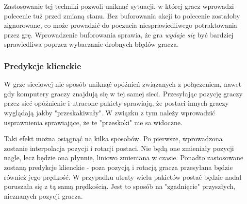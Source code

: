 Zastosowanie tej techniki pozwoli uniknąć sytuacji, w której gracz wprowadzi polecenie tuż przed zmianą stanu. Bez buforowania akcji to polecenie zostałoby zignorowane, co może prowadzić do poczucia niesprawiedliwego potraktowania przez grę. Wprowadzenie buforowania sprawia, że gra \emph{wydaje się} być bardziej sprawiedliwa poprzez wybaczanie drobnych błędów gracza.

\subsubsection{Predykcje klienckie}\label{sec:concept_prediction}

W grze sieciowej nie sposób uniknąć opóźnień związanych z połączeniem, nawet gdy komputery graczy znajdują się w tej samej sieci. Przesyłając pozycję graczy przez sieć opóźnienie i utracone pakiety sprawiają, że postaci innych graczy wyglądają jakby "przeskakiwały". W związku z tym należy wprowadzić usprawnienia sprawiające, że te "przeskoki" nie sa widoczne. 

Taki efekt można osiągnąć na kilka sposobów. Po pierwsze, wprowadzona zostanie interpolacja pozycji i rotacji postaci. Nie będą one zmieniały pozycji nagle, lecz będzie ona płynnie, liniowo zmieniana w czasie. Ponadto zastosowane zostaną predykcje klienckie - poza pozycją i rotacją gracza przesyłana będzie również jego prędkość. W przypadku utraty wielu pakietów postać będzie nadal poruszała się z tą samą prędkością. Jest to sposób na "zgadnięcie" przyszłych, nieznanych pozycji gracza.  

